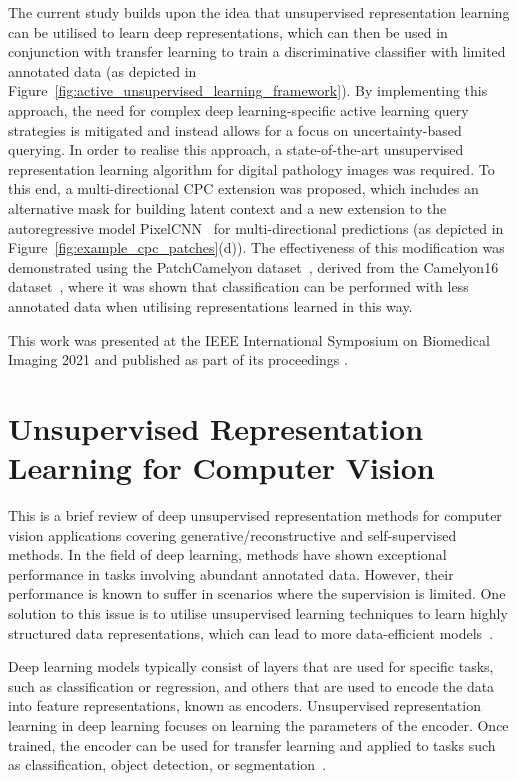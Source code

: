 The current study builds upon the idea that unsupervised representation learning can be utilised to learn deep representations, which can then be used in conjunction with transfer learning to train a discriminative classifier with limited annotated data (as depicted in Figure~\ref{fig:active_unsupervised_learning_framework}). By implementing this approach, the need for complex deep learning-specific active learning query strategies is mitigated and instead allows for a focus on uncertainty-based querying. In order to realise this approach, a state-of-the-art unsupervised representation learning algorithm for digital pathology images was required. To this end, a multi-directional CPC extension was proposed, which includes an alternative mask for building latent context and a new extension to the autoregressive model PixelCNN~\citep{oord2016pixel} for multi-directional predictions (as depicted in Figure~\ref{fig:example_cpc_patches}(d)). The effectiveness of this modification was demonstrated using the PatchCamelyon dataset~\citep{veeling2018rotation}, derived from the Camelyon16 dataset~\citep{litjens20181399}, where it was shown that classification can be performed with less annotated data when utilising representations learned in this way. 

This work was presented at the IEEE International Symposium on Biomedical Imaging 2021 and published as part of its proceedings \citep{carse2021unsupervised}.



\section{Unsupervised Representation Learning for Computer Vision}
\label{subsec:unsupervised_representation}
This is a brief review of deep unsupervised representation methods for computer vision applications covering generative/reconstructive and self-supervised methods. In the field of deep learning, methods have shown exceptional performance in tasks involving abundant annotated data. However, their performance is known to suffer in scenarios where the supervision is limited. One solution to this issue is to utilise unsupervised learning techniques to learn highly structured data representations, which can lead to more data-efficient models~\citep{lake2015human}.

Deep learning models typically consist of layers that are used for specific tasks, such as classification or regression, and others that are used to encode the data into feature representations, known as encoders. Unsupervised representation learning in deep learning focuses on learning the parameters of the encoder. Once trained, the encoder can be used for transfer learning and applied to tasks such as classification, object detection, or segmentation~\citep{weiss2016survey}.

